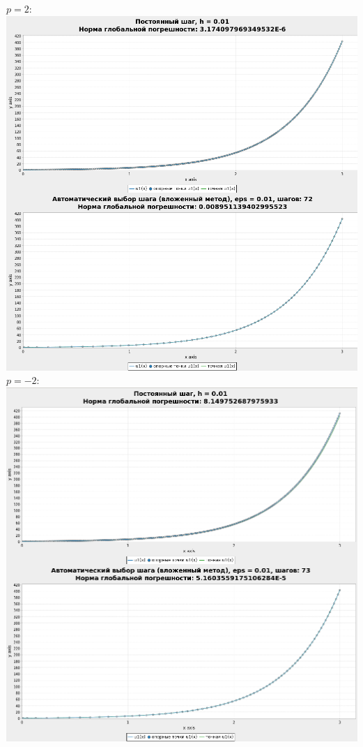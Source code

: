 \documentclass[a4paper,12pt]{article}
\begin{document}
\begin{flushleft}
\begin{enumerate}
      $p = 2:$\linebreak\linebreak\includegraphics{xp2.png}\linebreak\linebreak
      $p = -2:$\linebreak\linebreak\includegraphics{xpm2.png}\linebreak\linebreak

\end{enumerate}
\end{flushleft}
\end{document}
